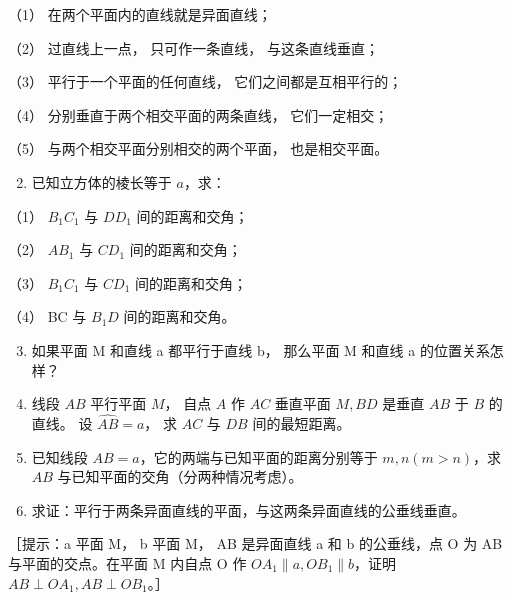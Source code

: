 （1） 在两个平面内的直线就是异面直线；

（2） 过直线上一点， 只可作一条直线， 与这条直线垂直；

（3） 平行于一个平面的任何直线， 它们之间都是互相平行的；

（4） 分别垂直于两个相交平面的两条直线， 它们一定相交；

（5） 与两个相交平面分别相交的两个平面， 也是相交平面。

\begin{enumerate}
\setcounter{enumi}{1}
\item
  已知立方体的棱长等于 \(a\)，求：
\end{enumerate}

（1） \(B_{1}C_{1}\) 与 \(DD_{1}\) 间的距离和交角；

（2） \(AB_{1}\) 与 \(CD_{1}\) 间的距离和交角；

（3） \(B_{1}C_{1}\) 与 \(CD_{1}\) 间的距离和交角；

（4） BC 与 \(B_{1}D\) 间的距离和交角。

\begin{enumerate}
\setcounter{enumi}{2}
\item
  如果平面 M 和直线 a 都平行于直线 b， 那么平面 M 和直线 a
  的位置关系怎样？
\item
  线段 \(AB\) 平行平面 \(M\)， 自点 \(A\) 作 \(AC\) 垂直平面 \(M, BD\)
  是垂直 \(AB\) 于 \(B\) 的直线。 设 \(\hat{AB} = a\)， 求 \(AC\) 与
  \(DB\) 间的最短距离。
\item
  已知线段 \(AB = a\)，它的两端与已知平面的距离分别等于
  \(m, n (m > n)\)，求 \(AB\) 与已知平面的交角（分两种情况考虑）。
\item
  求证：平行于两条异面直线的平面，与这两条异面直线的公垂线垂直。
\end{enumerate}

［提示：a \textbar\textbar{} 平面 M， b \textbar\textbar{} 平面 M， AB
是异面直线 a 和 b 的公垂线，点 O 为 AB 与平面的交点。在平面 M 内自点 O
作 \(OA_{1} \parallel a, OB_{1} \parallel b\)，证明
\(AB \perp OA_{1}, AB \perp OB_{1}\)。］

